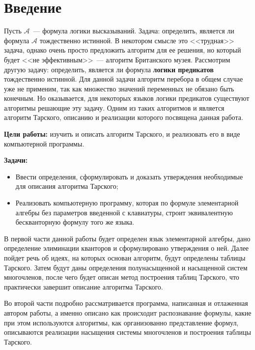 \section*{Введение}

Пусть $\mathcal{A}$~--- формула логики высказываний. Задача: определить, является ли формула $\mathcal{A}$ тождественно истинной. В некотором смысле это <<трудная>> задача, однако очень просто предложить алгоритм для ее решения, но который будет <<не эффективным>>~--- алгоритм Британского музея. Рассмотрим другую задачу: определить, является ли формула \textbf{логики предикатов} тождественно истинной. Для данной задачи алгоритм перебора в общем случае уже не применим, так как множество значений переменных не обязано быть конечным. Но оказывается, для некоторых языков логики предикатов существуют алгоритмы решающие эту задачу. Одним из таких алгоритмов и является алгоритм Тарского, описанию и реализации которого посвящена данная работа.

\textbf{Цели работы:} изучить и описать алгоритм Тарского, и реализовать его в виде компьютерной программы.

\textbf{Задачи:}
\begin{itemize}
	\item Ввести определения, сформулировать и доказать утверждения необходимые для описания алгоритма Тарского;
	\item Реализовать компьютерную программу, которая по формуле элементарной алгебры без параметров   введенной с клавиатуры, строит эквивалентную бескванторную формулу того же языка. 
\end{itemize}

В первой части данной работы будет определен язык элементарной алгебры, дано определение элиминации кванторов и сформулировано утверждения о ней. Далее пойдет речь об идеях, на которых основан алгоритм, будут определены таблицы Тарского. Затем будут даны определения полунасыщенной и насыщенной систем многочленов, после чего будет описан метод построения таблиц Тарского, что практически завершит описание алгоритма Тарского.

Во второй части подробно рассматривается программа, написанная и отлаженная автором работы, а именно описано как происходит распознавание формулы, какие при этом используются алгоритмы, как организованно представление формул, описываются реализации насыщения системы многочленов и построения таблицы Тарского. 



